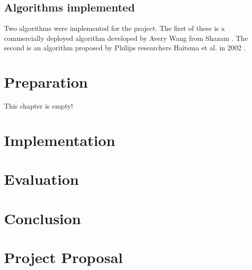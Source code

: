 \documentclass[12pt,a4paper,twoside,openright]{report}
\begin{document}
\section{Algorithms implemented}

Two algorithms were implemented for the project. The first of these is a commercially deployed algorithm developed by Avery Wang from Shazam \cite{Wang03}. The second is an algorithm proposed by Philips researchers Haitsma et al. in 2002 \cite{Haitsma02}.


\chapter{Preparation}

This chapter is empty!


\chapter{Implementation}




\chapter{Evaluation}



\chapter{Conclusion}






\appendix


\chapter{Project Proposal}


\end{document}
